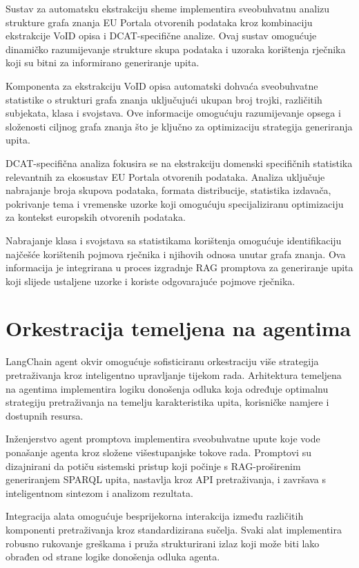 Sustav za automatsku ekstrakciju sheme implementira sveobuhvatnu analizu strukture grafa znanja EU Portala otvorenih podataka kroz kombinaciju ekstrakcije VoID opisa i DCAT-specifične analize. Ovaj sustav omogućuje dinamičko razumijevanje strukture skupa podataka i uzoraka korištenja rječnika koji su bitni za informirano generiranje upita.

Komponenta za ekstrakciju VoID opisa automatski dohvaća sveobuhvatne statistike o strukturi grafa znanja uključujući ukupan broj trojki, različitih subjekata, klasa i svojstava. Ove informacije omogućuju razumijevanje opsega i složenosti ciljnog grafa znanja što je ključno za optimizaciju strategija generiranja upita.

DCAT-specifična analiza fokusira se na ekstrakciju domenski specifičnih statistika relevantnih za ekosustav EU Portala otvorenih podataka. Analiza uključuje nabrajanje broja skupova podataka, formata distribucije, statistika izdavača, pokrivanje tema i vremenske uzorke koji omogućuju specijaliziranu optimizaciju za kontekst europskih otvorenih podataka.

Nabrajanje klasa i svojstava sa statistikama korištenja omogućuje identifikaciju najčešće korištenih pojmova rječnika i njihovih odnosa unutar grafa znanja. Ova informacija je integrirana u proces izgradnje RAG promptova za generiranje upita koji slijede ustaljene uzorke i koriste odgovarajuće pojmove rječnika.

\section{Orkestracija temeljena na agentima}
\label{sec:agent_orchestration}

LangChain agent okvir omogućuje sofisticiranu orkestraciju više strategija pretraživanja kroz inteligentno upravljanje tijekom rada. Arhitektura temeljena na agentima implementira logiku donošenja odluka koja određuje optimalnu strategiju pretraživanja na temelju karakteristika upita, korisničke namjere i dostupnih resursa.

Inženjerstvo agent promptova implementira sveobuhvatne upute koje vode ponašanje agenta kroz složene višestupanjske tokove rada. Promptovi su dizajnirani da potiču sistemski pristup koji počinje s RAG-proširenim generiranjem SPARQL upita, nastavlja kroz API pretraživanja, i završava s inteligentnom sintezom i analizom rezultata.

Integracija alata omogućuje besprijekorna interakcija između različitih komponenti pretraživanja kroz standardizirana sučelja. Svaki alat implementira robusno rukovanje greškama i pruža strukturirani izlaz koji može biti lako obrađen od strane logike donošenja odluka agenta.

